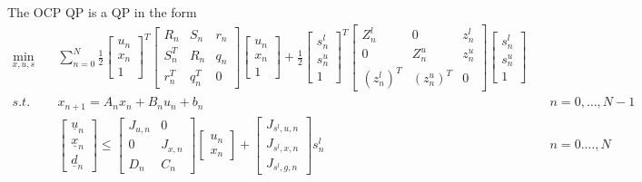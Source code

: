 \documentclass[a4paper]{report}
\begin{document}
The OCP QP is a QP in the form
\begin{align*}
\min_{x,u,s} & \quad \sum_{n=0}^N \frac 1 2 \begin{bmatrix} u_n \\ x_n \\ 1 \end{bmatrix}^T \begin{bmatrix} R_n & S_n & r_n \\ S_n^T & R_n & q_n \\ r_n^T & q_n^T & 0 \end{bmatrix} \begin{bmatrix} u_n \\ x_n \\ 1 \end{bmatrix} + \frac 1 2 \begin{bmatrix} s^l_n \\ s^u_n \\ 1 \end{bmatrix}^T \begin{bmatrix} Z^l_n & 0 & z^l_n \\ 0 & Z^u_n & z^u_n \\ (z^l_n)^T & (z^u_n)^T & 0 \end{bmatrix} \begin{bmatrix} s^l_n \\ s^u_n \\ 1 \end{bmatrix} \\
s.t. & \quad x_{n+1} = A_n x_n + B_n u_n + b_n & \quad n=0,\dots,N-1 \\
& \quad \begin{bmatrix} \underline u_n \\ \underline x_n \\ \underline d_n \end{bmatrix} \leq \begin{bmatrix} J_{u,n} & 0 \\ 0 & J_{x,n} \\ D_n & C_n \end{bmatrix} \begin{bmatrix} u_n \\ x_n \end{bmatrix} + \begin{bmatrix} J_{s^l,u,n} \\ J_{s^l,x,n} \\ J_{s^l,g,n} \end{bmatrix} s^l_n & \quad n=0.\dots,N \\

\end{align*}
\end{document}
